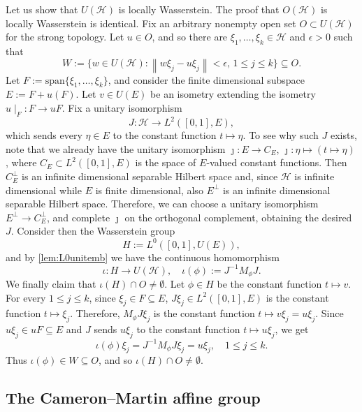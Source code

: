 \documentclass{amsart}
\numberwithin{equation}{subsection}
\theoremstyle{plain}
\theoremstyle{definition}
\theoremstyle{plain}
\begin{document}
Let us show that \(U\left(\mathcal{H}\right)\) is locally Wasserstein. The proof that \(O\left(\mathcal{H}\right)\) is locally Wasserstein is identical. Fix an arbitrary nonempty open set \(O\subset U\left(\mathcal{H}\right)\) for the strong topology. Let \(u\in O\), and so there are \(\xi_{1},\dotsc,\xi_{k}\in\mathcal{H}\) and \(\epsilon>0\) such that
\[W:=\{w\in U\left(\mathcal{H}\right):\left\|w\xi_{j}-u\xi_{j}\right\|<\epsilon,\,1\leq j\leq k\}\subseteq O.\]
Let \(F:=\mathrm{span}\{\xi_{1},\dotsc,\xi_{k}\}\), and consider the finite dimensional subspace \(E:=F+u\left(F\right)\). Let \(v\in U\left(E\right)\) be an isometry extending the isometry \(u\mid_{F}:F\to uF\). Fix a unitary isomorphism
\[J:\mathcal{H}\to L^{2}\left(\left[0,1\right],E\right),\]
which sends every \(\eta\in E\) to the constant function \(t\mapsto\eta\). To see why such \(J\) exists, note that we already have the unitary isomorphism \(\jmath:E\to C_{E}\), \(\jmath:\eta\mapsto\left(t\mapsto\eta\right)\), where \(C_{E}\subset L^{2}\left(\left[0,1\right],E\right)\) is the space of \(E\)-valued constant functions. Then \(C_{E}^{\perp}\) is an infinite dimensional separable Hilbert space and, since \(\mathcal{H}\) is infinite dimensional while \(E\) is finite dimensional, also \(E^{\perp}\) is an infinite dimensional separable Hilbert space. Therefore, we can choose a unitary isomorphism \(E^{\perp}\to C_{E}^{\perp}\), and complete \(\jmath\) on the orthogonal complement, obtaining the desired \(J\). Consider then the Wasserstein group
\[H:=L^{0}\left(\left[0,1\right],U\left(E\right)\right),\]
and by \cref{lem:L0unitemb} we have the continuous homomorphism
\[\iota:H\to U\left(\mathcal{H}\right),\quad\iota\left(\phi\right):=J^{-1}M_{\phi}J.\]
We finally claim that \(\iota\left(H\right)\cap O\neq\emptyset\). Let \(\phi\in H\) be the constant function \(t\mapsto v\). For every \(1\leq j\leq k\), since \(\xi_{j}\in F\subseteq E\), \(J\xi_{j}\in L^{2}\left(\left[0,1\right],E\right)\) is the constant function \(t\mapsto\xi_{j}\). Therefore, \(M_{\phi}J\xi_{j}\) is the constant function \(t\mapsto v\xi_{j}=u\xi_{j}\). Since \(u\xi_{j}\in uF\subseteq E\) and \(J\) sends \(u\xi_{j}\) to the constant function \(t\mapsto u\xi_{j}\), we get
\[\iota\left(\phi\right)\xi_{j}=J^{-1}M_{\phi}J\xi_{j}=u\xi_{j},\quad1\leq j\leq k.\]
Thus \(\iota\left(\phi\right)\in W\subseteq O\), and so \(\iota\left(H\right)\cap O\neq\emptyset\).

\subsection{The Cameron--Martin affine group}
\end{document}
